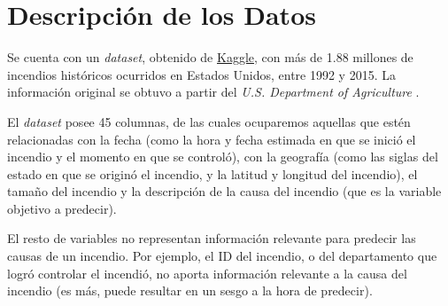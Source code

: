 \section{Descripción de los Datos}

Se cuenta con un \textit{dataset}, obtenido de \href{https://www.kaggle.com/rtatman/188-million-us-wildfires}{Kaggle}, con más de 1.88 millones de incendios históricos ocurridos en Estados Unidos, entre 1992 y 2015. La información original se obtuvo a partir del \textit{U.S. Department of Agriculture} \cite{FPA}.

El \textit{dataset} posee 45 columnas, de las cuales ocuparemos aquellas que estén relacionadas con la fecha (como la hora y fecha estimada en que se inició el incendio y el momento en que se controló), con la geografía (como las siglas del estado en que se originó el incendio, y la latitud y longitud del incendio), el tamaño del incendio y la descripción de la causa del incendio (que es la variable objetivo a predecir). 

El resto de variables no representan información relevante para predecir las causas de un incendio. Por ejemplo, el ID del incendio, o del departamento que logró controlar el incendió, no aporta información relevante a la causa del incendio (es más, puede resultar en un sesgo a la hora de predecir).

